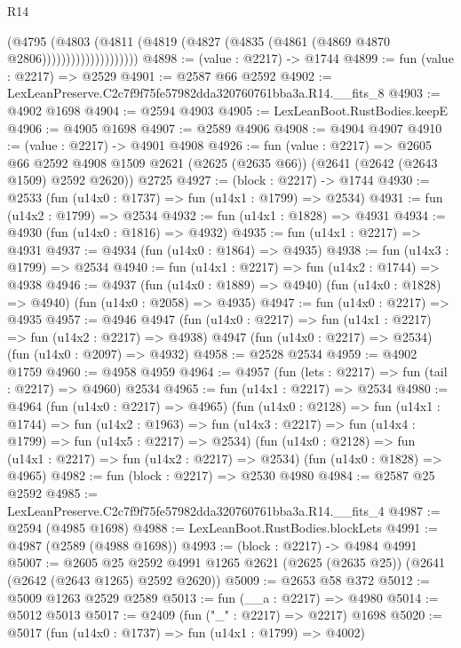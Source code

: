 \begin{lexlean}{R14}
\begin{coremodule}
                            (@4795
                              (@4803
                                (@4811
                                  (@4819 (@4827 (@4835 (@4861 (@4869 @4870 @2806))))))))))))))))))))
@4898 := (value : @2217) -> @1744
@4899 := fun (value : @2217) => @2529
@4901 := @2587 @66 @2592
@4902 := LexLeanPreserve.C2c7f9f75fe57982dda320760761bba3a.R14.__fits_8
@4903 := @4902 @1698
@4904 := @2594 @4903
@4905 := LexLeanBoot.RustBodies.keepE
@4906 := @4905 @1698
@4907 := @2589 @4906
@4908 := @4904 @4907
@4910 := (value : @2217) -> @4901 @4908
@4926 := fun (value : @2217) =>
  @2605
    @66
    @2592
    @4908
    @1509
    @2621
    (@2625 (@2635 @66))
    (@2641 (@2642 (@2643 @1509) @2592 @2620))
    @2725
@4927 := (block : @2217) -> @1744
@4930 := @2533 (fun (u14x0 : @1737) => fun (u14x1 : @1799) => @2534)
@4931 := fun (u14x2 : @1799) => @2534
@4932 := fun (u14x1 : @1828) => @4931
@4934 := @4930 (fun (u14x0 : @1816) => @4932)
@4935 := fun (u14x1 : @2217) => @4931
@4937 := @4934 (fun (u14x0 : @1864) => @4935)
@4938 := fun (u14x3 : @1799) => @2534
@4940 := fun (u14x1 : @2217) => fun (u14x2 : @1744) => @4938
@4946 := @4937
    (fun (u14x0 : @1889) => @4940)
    (fun (u14x0 : @1828) => @4940)
    (fun (u14x0 : @2058) => @4935)
@4947 := fun (u14x0 : @2217) => @4935
@4957 := @4946
    @4947
    (fun (u14x0 : @2217) => fun (u14x1 : @2217) => fun (u14x2 : @2217) => @4938)
    @4947
    (fun (u14x0 : @2217) => @2534)
    (fun (u14x0 : @2097) => @4932)
@4958 := @2528 @2534
@4959 := @4902 @1759
@4960 := @4958 @4959
@4964 := @4957 (fun (lets : @2217) => fun (tail : @2217) => @4960) @2534
@4965 := fun (u14x1 : @2217) => @2534
@4980 := @4964
    (fun (u14x0 : @2217) => @4965)
    (fun (u14x0 : @2128) =>
    fun (u14x1 : @1744) =>
    fun (u14x2 : @1963) =>
    fun (u14x3 : @2217) => fun (u14x4 : @1799) => fun (u14x5 : @2217) => @2534)
    (fun (u14x0 : @2128) => fun (u14x1 : @2217) => fun (u14x2 : @2217) => @2534)
    (fun (u14x0 : @1828) => @4965)
@4982 := fun (block : @2217) => @2530 @4980
@4984 := @2587 @25 @2592
@4985 := LexLeanPreserve.C2c7f9f75fe57982dda320760761bba3a.R14.__fits_4
@4987 := @2594 (@4985 @1698)
@4988 := LexLeanBoot.RustBodies.blockLets
@4991 := @4987 (@2589 (@4988 @1698))
@4993 := (block : @2217) -> @4984 @4991
@5007 := @2605
    @25
    @2592
    @4991
    @1265
    @2621
    (@2625 (@2635 @25))
    (@2641 (@2642 (@2643 @1265) @2592 @2620))
@5009 := @2653 @58 @372
@5012 := @5009 @1263 @2529 @2589
@5013 := fun (__a : @2217) => @4980
@5014 := @5012 @5013
@5017 := @2409 (fun ("_" : @2217) => @2217) @1698
@5020 := @5017 (fun (u14x0 : @1737) => fun (u14x1 : @1799) => @4002)

\end{coremodule}
\end{lexlean}
